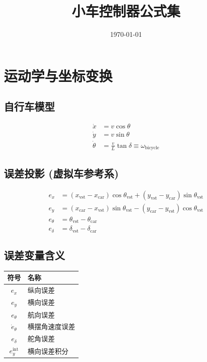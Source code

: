 \documentclass[11pt,a4paper]{article}
\title{小车控制器公式集}
\author{}
\date{\today}
\begin{document}
\maketitle

\section{运动学与坐标变换}

\subsection{自行车模型}

\begin{align}
\dot{x}   &= v \cos\theta \\
\dot{y}   &= v \sin\theta \\
\dot\theta &= \frac{v}{L}\tan\delta \equiv \omega_{\text{bicycle}}
\end{align}

\subsection{误差投影 (虚拟车参考系)}

\begin{align}
e_x &= (x_{\text{vst}} - x_{\text{car}})\cos\theta_{\text{vst}} + (y_{\text{vst}} - y_{\text{car}})\sin\theta_{\text{vst}} \\
e_y &= (x_{\text{car}} - x_{\text{vst}})\sin\theta_{\text{vst}} - (y_{\text{car}} - y_{\text{vst}})\cos\theta_{\text{vst}} \\
e_\theta &= \theta_{\text{vst}} - \theta_{\text{car}} \\
e_\delta &= \delta_{\text{vst}} - \delta_{\text{car}}
\end{align}

\subsection{误差变量含义}

\begin{center}
\begin{tabular}{c|l}
\toprule
符号 & 名称 \\
\midrule
$e_x$ & 纵向误差 \\
$e_y$ & 横向误差 \\
$e_\theta$ & 航向误差 \\
$\dot{e}_\theta$ & 横摆角速度误差 \\
$e_\delta$ & 舵角误差 \\
$e_y^{\text{int}}$ & 横向误差积分 \\
\bottomrule
\end{tabular}
\end{center}
\end{document}
